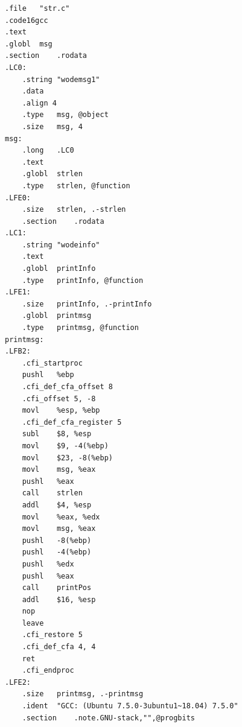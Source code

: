 \documentclass[a4paper, 11pt]{article} %
\newcounter{code}
\begin{document}
\begin{lstlisting}[language={[x86masm]Assembler},label=str.o,caption=str.o]
.file	"str.c"
.code16gcc
.text
.globl	msg
.section	.rodata
.LC0:
	.string	"wodemsg1"
	.data
	.align 4
	.type	msg, @object
	.size	msg, 4
msg:
	.long	.LC0
	.text
	.globl	strlen
	.type	strlen, @function
.LFE0:
	.size	strlen, .-strlen
	.section	.rodata
.LC1:
	.string	"wodeinfo"
	.text
	.globl	printInfo
	.type	printInfo, @function
.LFE1:
	.size	printInfo, .-printInfo
	.globl	printmsg
	.type	printmsg, @function
printmsg:
.LFB2:
	.cfi_startproc
	pushl	%ebp
	.cfi_def_cfa_offset 8
	.cfi_offset 5, -8
	movl	%esp, %ebp
	.cfi_def_cfa_register 5
	subl	$8, %esp
	movl	$9, -4(%ebp)
	movl	$23, -8(%ebp)
	movl	msg, %eax
	pushl	%eax
	call	strlen
	addl	$4, %esp
	movl	%eax, %edx
	movl	msg, %eax
	pushl	-8(%ebp)
	pushl	-4(%ebp)
	pushl	%edx
	pushl	%eax
	call	printPos
	addl	$16, %esp
	nop
	leave
	.cfi_restore 5
	.cfi_def_cfa 4, 4
	ret
	.cfi_endproc
.LFE2:
	.size	printmsg, .-printmsg
	.ident	"GCC: (Ubuntu 7.5.0-3ubuntu1~18.04) 7.5.0"
	.section	.note.GNU-stack,"",@progbits

\end{lstlisting}


\end{document}
